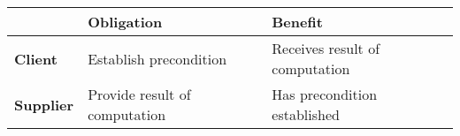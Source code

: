 \documentclass[11pt]{article}
\def\rootdir{../}
\begin{document}
\vfill

\begin{center}
\begin{tabular}{lll}
\toprule
   & \textbf{Obligation} & \textbf{Benefit}\\
\midrule
 \textbf{Client} & Establish precondition & Receives result of computation \\
 \textbf{Supplier}  & Provide result of computation & Has precondition established\\
\bottomrule
\end{tabular}
\end{center}

\vfill

\pagebreak

\lstset{language=Ada}
\lstset{aboveskip=3mm}


\pagebreak

\lstset{language=Ada}
\lstset{aboveskip=3mm}

\end{document}
